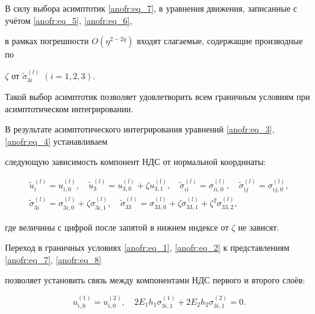 В силу выбора асимптотик \eqref{anofr:eq_7}, в уравнения движения, записанные с учётом \eqref{anofr:eq_5}, \eqref{anofr:eq_6},

в рамках погрешности $O(\eta^{2-2q} )$ входят слагаемые, содержащие производные по

$\zeta $ от $\tilde{\sigma }_{3i}^{(l)}$ $(i=1, 2, 3)$.

Такой выбор асимптотик позволяет удовлетворить всем граничным условиям при асимптотическом интегрировании.



В результате асимптотического интегрирования уравнений \eqref{anofr:eq_3}, \eqref{anofr:eq_4} устанавливаем

следующую зависимость компонент НДС от нормальной координаты:

\begin{equation}

\label{anofr:eq_8}

\begin{array}{c}

\tilde{u}_i^{(l)} =u_{i,0}^{(l)},\quad \tilde{u}_{3}^{(l)} =u_{3,0}^{(l)} +\zeta u_{3,1}^{(l)} ,\quad

\tilde{\sigma }_{ii}^{(l)} =\sigma _{ii,0}^{(l)},\quad \tilde{\sigma }_{ij}^{(l)} =\sigma _{ij,0}^{(l)}, \\

\tilde{\sigma }_{3i}^{(l)} =\sigma _{3i,0}^{(l)} +\zeta \sigma _{3i,1}^{(l)},\quad

\tilde{\sigma }_{33}^{(l)} =\sigma _{33,0}^{(l)} +\zeta \sigma _{33,1}^{(l)} +\zeta ^{2} \sigma _{33,2}^{(l)},

\end{array}

\end{equation}

где величины с цифрой после запятой в нижнем индексе от $\zeta$ не зависят.



Переход в граничных условиях \eqref{anofr:eq_1}, \eqref{anofr:eq_2} к представлениям \eqref{anofr:eq_7}, \eqref{anofr:eq_8}

позволяет установить связь между компонентами НДС первого и второго слоёв:

\begin{equation*}

 u_{i,0}^{(1)} =u_{i,0}^{(2)} ,\quad 2E_{1} h_{1} \sigma _{3i,1}^{(1)} +2E_{2} h_{2} \sigma _{3i,1}^{(2)} =0.

\end{equation*}



